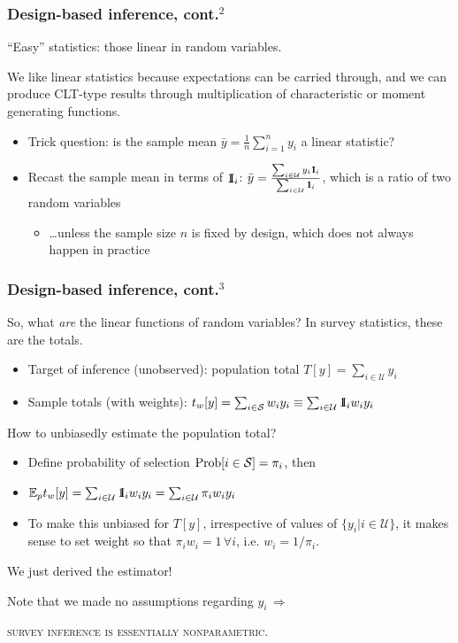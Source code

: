 \documentclass[aspectratio=43]{beamer}
\newcommand{\Expect}{\mathbb{E}}
\newcommand{\One}{{\rm 1\kern-0.3em I}}
\begin{document}
\begin{frame}\frametitle{Design-based inference, cont.$^2$}

``Easy'' statistics: those linear in random variables.

\bigskip

We like linear statistics because expectations can be carried through,
and we can produce CLT-type results through multiplication of characteristic 
or moment generating functions.

\begin{itemize}
    \item Trick question: is the sample mean $\bar y = \frac 1n\sum_{i=1}^n y_i$ a linear statistic?
    \item Recast the sample mean in terms of $\One_i$: 
          $\bar y = \frac{\sum_{i\in\mathcal{U}} y_i \One_i}{\sum_{i\in\mathcal{U}} \One_i}$,
          which is a ratio of two random variables
	 \begin{itemize}
	      \item \ldots unless the sample size $n$ is fixed by design, which does not always happen in practice
	 \end{itemize}
\end{itemize}

\end{frame}

\begin{frame}\frametitle{Design-based inference, cont.$^3$}

So, what \textit{are} the linear functions of random variables? In survey statistics, these are the totals.

\begin{itemize}
    \item Target of inference (unobserved): population total $T[y] = \sum_{i\in\mathcal{U}} y_i$
    \item Sample totals (with weights): $t_w[y] = \sum_{i\in\mathcal{S}} w_i y_i \equiv \sum_{i\in\mathcal{U}} \One_i w_i y_i$
\end{itemize}

How to unbiasedly estimate the population total?
\begin{itemize}
    \item Define probability of selection ${\rm Prob}[i\in\mathcal{S}]=\pi_i$, then
    \item $\Expect_p t_w[y] = \sum_{i\in\mathcal{U}} \One_i w_i y_i = \sum_{i\in\mathcal{U}} \pi_i w_i y_i$
    \item To make this unbiased for $T[y]$, irrespective of values of $\{ y_i| i\in \mathcal{U}\}$,
        it makes sense to set weight so that $\pi_i w_i = 1 \, \forall i$, i.e. $w_i = 1/\pi_i$.
\end{itemize}

We just derived the \citet{horvitz:thompson:1952} estimator!

\bigskip

Note that we made no assumptions regarding $y_i \, \Rightarrow$

\centering

\textsc{survey inference is essentially nonparametric}.

\end{frame}
\end{document}
